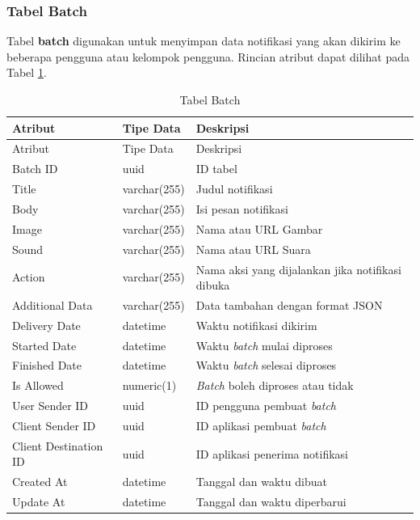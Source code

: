 \subsubsection{Tabel Batch}
\par Tabel \textbf{batch} digunakan untuk menyimpan data notifikasi yang akan dikirim ke beberapa pengguna atau kelompok pengguna. Rincian atribut dapat dilihat pada Tabel \ref{tabel_batch}.
\begin{longtable}{|p{2cm}|p{2.5cm}|p{4.5cm}|}
	\caption{Tabel Batch} \label{tabel_batch} \\ \hline
    \rowcolor{lightgray} {Atribut} & {Tipe Data} & {Deskripsi} \\ \hline
    \endfirsthead
    \hline
    \rowcolor{lightgray} {Atribut} & {Tipe Data} & {Deskripsi} \\ \hline
    \endhead
    Batch ID & uuid & ID tabel \\ \hline
    Title & varchar(255) & Judul notifikasi \\ \hline
    Body & varchar(255) & Isi pesan notifikasi \\ \hline
    Image & varchar(255) & Nama atau URL Gambar \\ \hline
    Sound & varchar(255) & Nama atau URL Suara \\ \hline
    Action & varchar(255) & Nama aksi yang dijalankan jika notifikasi dibuka \\ \hline
    Additional Data & varchar(255) & Data tambahan dengan format JSON \\ \hline
    Delivery Date & datetime & Waktu notifikasi dikirim \\ \hline
    Started Date & datetime & Waktu \textit{batch} mulai diproses \\ \hline
    Finished Date & datetime & Waktu \textit{batch} selesai diproses \\ \hline
    Is Allowed & numeric(1) & \textit{Batch} boleh diproses atau tidak \\ \hline
    User Sender ID & uuid & ID pengguna pembuat \textit{batch} \\ \hline
    Client Sender ID & uuid & ID aplikasi pembuat \textit{batch} \\ \hline
    Client Destination ID & uuid & ID aplikasi penerima notifikasi \\ \hline
    Created At & datetime & Tanggal dan waktu dibuat \\ \hline
    Update At & datetime & Tanggal dan waktu diperbarui \\ \hline
\end{longtable}

